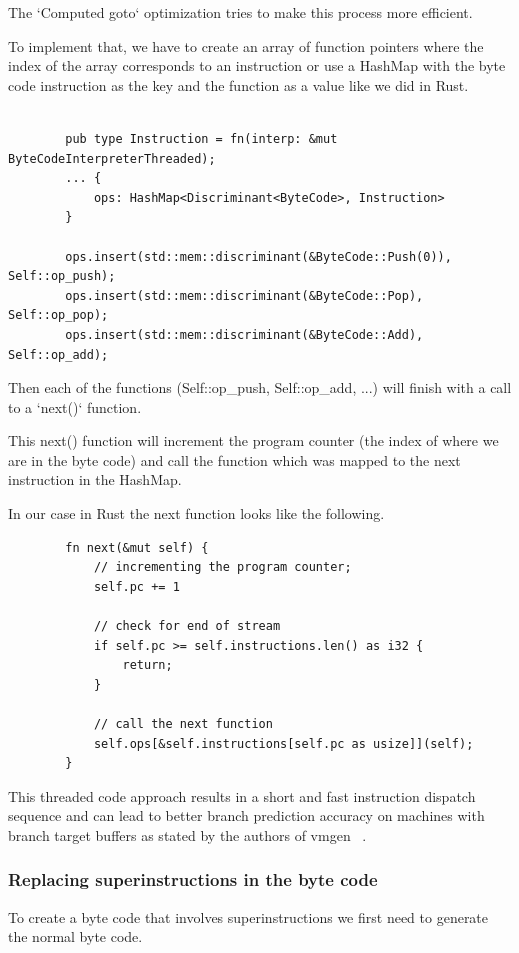 \documentclass{article}
\begin{document}
\begin{enumerate}
        The `Computed goto` optimization tries to make this process more efficient.

        To implement that, we have to create an array of function pointers where
        the index of the array corresponds to an instruction or use a HashMap
        with the byte code instruction as the key and the function as a value
        like we did in Rust.

        \begin{verbatim}

        pub type Instruction = fn(interp: &mut ByteCodeInterpreterThreaded);
        ... {
            ops: HashMap<Discriminant<ByteCode>, Instruction>
        }

        ops.insert(std::mem::discriminant(&ByteCode::Push(0)), Self::op_push);
        ops.insert(std::mem::discriminant(&ByteCode::Pop), Self::op_pop);
        ops.insert(std::mem::discriminant(&ByteCode::Add), Self::op_add);
        \end{verbatim}

        Then each of the functions (Self::op\_push, Self::op\_add, ...) will finish
        with a call to a `next()` function.

        This next() function will increment the program counter (the index of
        where we are in the byte code) and call the function which was mapped
        to the next instruction in the HashMap.

        In our case in Rust the next function looks like the following.

        \begin{verbatim}
        fn next(&mut self) {
            // incrementing the program counter;
            self.pc += 1 

            // check for end of stream
            if self.pc >= self.instructions.len() as i32 {
                return; 
            }

            // call the next function
            self.ops[&self.instructions[self.pc as usize]](self);
        }
        \end{verbatim}

        This threaded code approach results in a short and fast instruction
        dispatch sequence and can lead to better branch prediction accuracy on
        machines with branch target buffers as stated by the authors of vmgen ~\cite{vmgen}.

\end{enumerate}

\subsubsection{Replacing superinstructions in the byte code}
\label{sec:replacing_superinstructions}
To create a byte code that involves superinstructions we first need to generate
the normal byte code.
\end{document}
